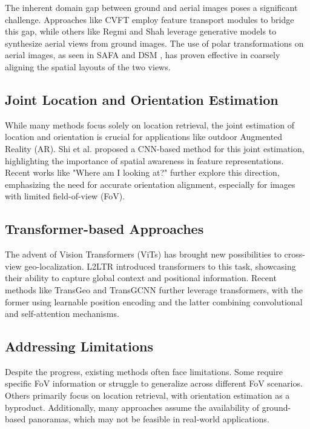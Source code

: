 The inherent domain gap between ground and aerial images poses a significant challenge.  Approaches like CVFT \cite{shi2019optimalfeaturetransportcrossview} employ feature transport modules to bridge this gap, while others like Regmi and Shah \cite{regmi2018cross} leverage generative models to synthesize aerial views from ground images. The use of polar transformations on aerial images, as seen in SAFA \cite{NEURIPS2019_ba2f0015} and DSM \cite{10.1016/j.compeleceng.2022.108335}, has proven effective in coarsely aligning the spatial layouts of the two views.

\subsection{Joint Location and Orientation Estimation}

While many methods focus solely on location retrieval, the joint estimation of location and orientation is crucial for applications like outdoor Augmented Reality (AR). Shi et al. \cite{10.1016/j.compeleceng.2022.108335} proposed a CNN-based method for this joint estimation, highlighting the importance of spatial awareness in feature representations. Recent works like "Where am I looking at?" \cite{shi2020ilookingatjoint} further explore this direction, emphasizing the need for accurate orientation alignment, especially for images with limited field-of-view (FoV).

\subsection{Transformer-based Approaches}

The advent of Vision Transformers (ViTs) has brought new possibilities to cross-view geo-localization. L2LTR \cite{yang2021cross} introduced transformers to this task, showcasing their ability to capture global context and positional information.  Recent methods like TransGeo \cite{wang2021multi} and TransGCNN \cite{zhou2024gtnetgraphtransformernetwork} further leverage transformers, with the former using learnable position encoding and the latter combining convolutional and self-attention mechanisms.

\subsection{Addressing Limitations}

Despite the progress, existing methods often face limitations. Some require specific FoV information or struggle to generalize across different FoV scenarios. Others primarily focus on location retrieval, with orientation estimation as a byproduct. Additionally, many approaches assume the availability of ground-based panoramas, which may not be feasible in real-world applications.

